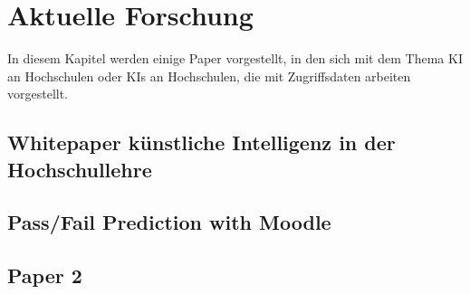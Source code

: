 \chapter{Aktuelle Forschung}
In diesem Kapitel werden einige Paper vorgestellt, in den sich mit dem Thema KI an Hochschulen oder KIs an Hochschulen, die mit Zugriffsdaten arbeiten vorgestellt.

\section{Whitepaper künstliche Intelligenz in der Hochschullehre}

\section{Pass/Fail Prediction with Moodle}

\section{Paper 2}
